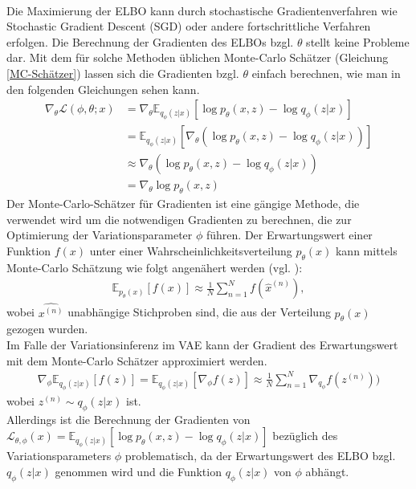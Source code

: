 \documentclass[%
thesis=student,%
coverpage=false,%
titlepage=false,%
headmarks=true, %
german,%
font=libertine, %
math=newpxtx, %
BCOR=5mm,%
coverBCOR=11mm%
]{tumbook}
\theoremstyle{break}
\begin{document}
\\
Die Maximierung der ELBO kann durch stochastische Gradientenverfahren wie Stochastic Gradient Descent (SGD) oder andere fortschrittliche Verfahren erfolgen. Die Berechnung der Gradienten des ELBOs bzgl. $\theta$ stellt keine Probleme dar. Mit dem für solche Methoden üblichen Monte-Carlo Schätzer (Gleichung \ref{MC-Schätzer}) lassen sich die Gradienten bzgl. $\theta$ einfach berechnen, wie man in den folgenden Gleichungen sehen kann.\\
\begin{align}
	\nabla_\theta \mathcal{L}(\phi, \theta;x) &=\nabla_\theta \mathbb{E}_{q_\phi(z|x)}[\log p_\theta(x,z)-\log q_\phi(z|x)] \\
	&=  \mathbb{E}_{q_\phi(z|x)}[\nabla_\theta (\log p_\theta(x,z)-\log q_\phi(z|x))] \\
	&\approx \nabla_\theta  (\log p_\theta(x,z)-\log q_\phi(z|x))\\
	&= \nabla_\theta  \log p_\theta(x,z) \label{MC-Schätzer}
\end{align}
Der Monte-Carlo-Schätzer für Gradienten ist eine gängige Methode, die verwendet wird um die notwendigen Gradienten zu berechnen, die zur Optimierung der Variationsparameter $\phi$ führen. Der Erwartungswert einer Funktion $f(x)$ unter einer Wahrscheinlichkeitsverteilung $p_\theta(x)$ kann mittels Monte-Carlo Schätzung wie folgt angenähert werden 
(vgl. \cite{MonteCarloEstimation}): 
\begin{align}
	\mathbb{E}_{p_\theta(x)}[f(x)] \approx \frac{1}{N} \sum_{n=1}^{N}f(\hat{x}^{(n)}),
\end{align}
wobei $\hat{x^{(n)}}$ unabhängige Stichproben sind, die aus der Verteilung $p_\theta(x)$ gezogen wurden.\\
Im Falle der Variationsinferenz im VAE kann der Gradient des Erwartungswert mit dem Monte-Carlo Schätzer approximiert werden.\\
\begin{align}
	\nabla_\phi \mathbb{E}_{q_\phi(z|x)}[f(z)]= \mathbb{E}_{q_\phi(z|x)}[\nabla_{\phi} f(z)] \approx \frac{1}{N} \sum_{n=1}^{N}\nabla_{q_\phi}f(z^{(n)})) \label{MonteCarloEstimator}
\end{align}
wobei $z^{(n)} \sim q_\phi(z|x)$ ist.\\
Allerdings ist die Berechnung
der Gradienten von $\mathcal{L}_{\theta,\phi}(x) = \mathbb{E}_{q_\phi(z|x)}\left[\log p_\theta(x,z)- \log q_\phi(z|x)\right]$ bezüglich des Variationsparameters $\phi$ problematisch, da der Erwartungswert des ELBO bzgl. $q_\phi(z|x)$ genommen wird und die Funktion $q_\phi(z|x)$  von $\phi$ abhängt. 
\end{document}
